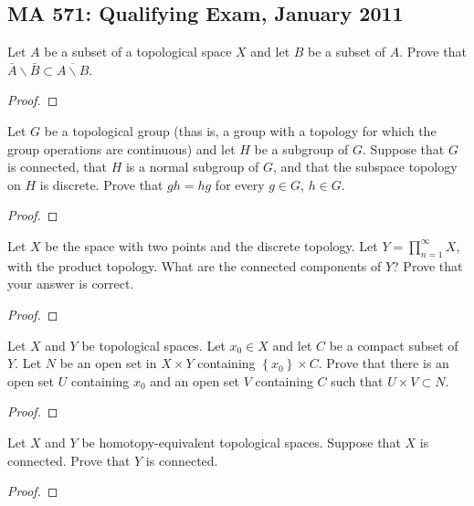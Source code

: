 \subsection{MA 571: Qualifying Exam, January 2011}
\begin{problem}
Let $A$ be a subset of a topological space $X$ and let $B$ be a subset of
$A$. Prove that $\bar A\smallsetminus\bar B\subset\overline{A\smallsetminus B}$.
\end{problem}
\begin{proof}
\end{proof}

\begin{problem}
Let $G$ be a topological group (thas is, a group with a topology for which
the group operations are continuous) and let $H$ be a subgroup of
$G$. Suppose that $G$ is connected, that $H$ is a normal subgroup of $G$,
and that the subspace topology on $H$ is discrete. Prove that $gh=hg$ for
every $g\in G$, $h\in G$.
\end{problem}
\begin{proof}
\end{proof}

\begin{problem}
Let $X$ be the space with two points and the discrete topology. Let
$Y=\prod_{n=1}^\infty X$, with the product topology. What are the connected
components of $Y$? Prove that your answer is correct.
\end{problem}
\begin{proof}
\end{proof}

\begin{problem}
Let $X$ and $Y$ be topological spaces. Let $x_0\in X$ and let $C$ be a
compact subset of $Y$. Let $N$ be an open set in $X\times Y$ containing
$\left\{x_0\right\}\times C$. Prove that there is an open set $U$
containing $x_0$ and an open set $V$ containing $C$ such that $U\times
V\subset N$.
\end{problem}
\begin{proof}
\end{proof}

\begin{problem}
Let $X$ and $Y$ be homotopy-equivalent topological spaces. Suppose that $X$
is connected. Prove that $Y$ is connected.
\end{problem}
\begin{proof}
\end{proof}

